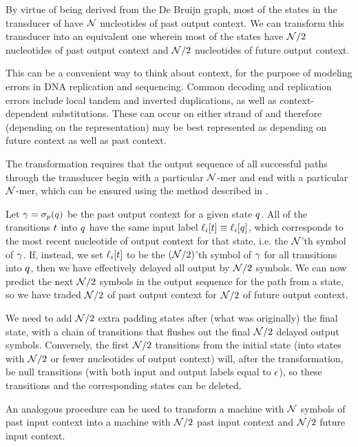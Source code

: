 \documentclass[english]{article}
\begin{document}
By virtue of being derived from the De Bruijn graph, most of the states in the transducer of 
have ${\cal N}$ nucleotides of past output context.
We can transform this transducer into an equivalent one wherein most of the states have
${\cal N}/2$ nucleotides of past output context
and ${\cal N}/2$ nucleotides of future output context.

This can be a convenient way to think about context, for the purpose of modeling errors in DNA replication and sequencing.
Common decoding and replication errors include local tandem and inverted duplications, as well as context-dependent substitutions.
These can occur on either strand of and therefore (depending on the representation) may be best represented as depending
on future context as well as past context.

The transformation requires that the output sequence of all successful paths through the transducer
begin with a particular ${\cal N}$-mer and end with a particular ${\cal N}$-mer,
which can be ensured using the method described in .

Let $\gamma = \sigma_p(q)$ be the past output context for a given state $q$.
All of the transitions $t$ into $q$ have the same input label $\ell_i[t] \equiv \ell_i[q]$,
which corresponds to the most recent nucleotide of output context for that state,
i.e. the ${\cal N}$'th symbol of $\gamma$.
If, instead, we set $\ell_i[t]$ to be the $({\cal N}/2)$'th symbol of $\gamma$
for all transitions into $q$, then we have effectively delayed all output by ${\cal N}/2$ symbols.
We can now predict the next ${\cal N}/2$ symbols in the output sequence for the path from a state,
so we have traded ${\cal N}/2$ of past output context for ${\cal N}/2$ of future output context.

We need to add ${\cal N}/2$ extra padding states after (what was originally) the final state,
with a chain of transitions that flushes out the final ${\cal N}/2$ delayed output symbols.
Conversely, the first ${\cal N}/2$ transitions from the initial state
(into states with ${\cal N}/2$ or fewer nucleotides of output context)
will, after the transformation,
be null transitions (with both input and output labels equal to $\epsilon$),
so these transitions and the corresponding states can be deleted.

An analogous procedure can be used to transform a machine with ${\cal N}$ symbols of past input context
into a machine with ${\cal N}/2$ past input context and ${\cal N}/2$ future input context.
\end{document}
